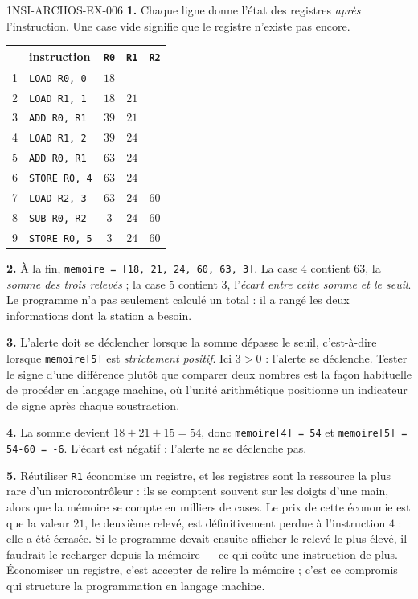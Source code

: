 \begin{corrige}{1NSI-ARCHOS-EX-006}
\textbf{1.} Chaque ligne donne l'état des registres \emph{après} l'instruction.
Une case vide signifie que le registre n'existe pas encore.

\begin{center}
\begin{tabular}{llccc}
\hline
 & instruction & \lstinline{R0} & \lstinline{R1} & \lstinline{R2} \\
\hline
1 & \lstinline{LOAD R0, 0}   & $18$ & & \\
2 & \lstinline{LOAD R1, 1}   & $18$ & $21$ & \\
3 & \lstinline{ADD R0, R1}   & $39$ & $21$ & \\
4 & \lstinline{LOAD R1, 2}   & $39$ & $24$ & \\
5 & \lstinline{ADD R0, R1}   & $63$ & $24$ & \\
6 & \lstinline{STORE R0, 4}  & $63$ & $24$ & \\
7 & \lstinline{LOAD R2, 3}   & $63$ & $24$ & $60$ \\
8 & \lstinline{SUB R0, R2}   & $3$  & $24$ & $60$ \\
9 & \lstinline{STORE R0, 5}  & $3$  & $24$ & $60$ \\
\hline
\end{tabular}
\end{center}

\textbf{2.} À la fin, \lstinline{memoire = [18, 21, 24, 60, 63, 3]}. La case
$4$ contient $63$, la \emph{somme des trois relevés} ; la case $5$ contient
$3$, l'\emph{écart entre cette somme et le seuil}. Le programme n'a pas
seulement calculé un total : il a rangé les deux informations dont la station a
besoin.

\textbf{3.} L'alerte doit se déclencher lorsque la somme dépasse le seuil,
c'est-à-dire lorsque \lstinline{memoire[5]} est \emph{strictement positif}. Ici
$3>0$ : l'alerte se déclenche. Tester le signe d'une différence plutôt que
comparer deux nombres est la façon habituelle de procéder en langage machine,
où l'unité arithmétique positionne un indicateur de signe après chaque
soustraction.

\textbf{4.} La somme devient $18+21+15=54$, donc \lstinline{memoire[4] = 54} et
\lstinline{memoire[5] = 54-60 = -6}. L'écart est négatif : l'alerte ne se
déclenche pas.

\textbf{5.} Réutiliser \lstinline{R1} économise un registre, et les registres
sont la ressource la plus rare d'un microcontrôleur : ils se comptent souvent
sur les doigts d'une main, alors que la mémoire se compte en milliers de cases.
Le prix de cette économie est que la valeur $21$, le deuxième relevé, est
définitivement perdue à l'instruction $4$ : elle a été écrasée. Si le programme
devait ensuite afficher le relevé le plus élevé, il faudrait le recharger depuis
la mémoire — ce qui coûte une instruction de plus. Économiser un registre, c'est
accepter de relire la mémoire ; c'est ce compromis qui structure la
programmation en langage machine.
\end{corrige}
